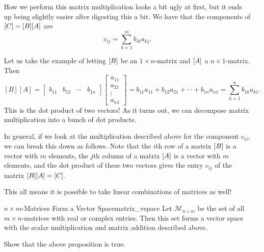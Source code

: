 \begin{itemize}
            How we perform this matrix multiplication looks a bit ugly at first, but it ends up being slightly easier after digesting this a bit. We have that the components of $[C]=[B] [A]$ are
            \[
            c_{ij}=\sum_{k=1}^m b_{ik}a_{kj}.
            \]
            
            Let us take the example of letting $[B]$ be an $1\times n$-matrix and $[A]$ a $n\times 1$-matrix. Then
            \[
            [B][A]=
            \begin{bmatrix} b_{11} & b_{12} & \cdots & b_{1n}\end{bmatrix}
            \begin{bmatrix} a_{11}\\ a_{21} \\ \vdots \\ a_{n1}\end{bmatrix}=b_{11}a_{11}+b_{12}a_{21}+\cdots+b_{1n}a_{n1}=\sum_{k=1}^n b_{1k}a_{k1}.
            \]
            This is the dot product of two vectors!  As it turns out, we can decompose matrix multiplication into a bunch of dot products. 
            
            In general, if we look at the multiplication described above for the component $c_{ij}$, we can break this down as follows. Note that the $i$th row of a matrix $[B]$ is a vector with $m$ elements, the $j$th column of a matrix $[A]$ is a vector with $m$ elements, and the dot product of these two vectors gives the entry $c_{ij}$ of the matrix $[B] [A]=[C]$.
            \end{itemize}
            
            \begin{remark}
            This all means it is possible to take linear combinations of matrices as well!
            \end{remark}
            
            \begin{prop}{$n\times m$-Matrices Form a Vector Space}{matrix_vspace}
                Let $\mathcal{M}_{n\times m}$ be the set of all $m\times n$-matrices with real or complex entries. Then this set forms a vector space with the scalar multiplication and matrix addition described above.
            \end{prop}
            
            \begin{exercise}
                Show that the above proposition is true.
            \end{exercise}
            
